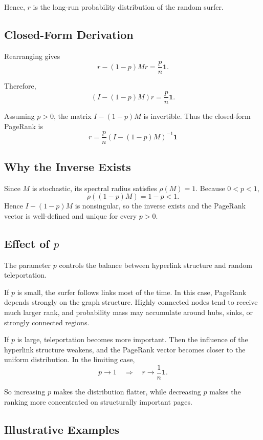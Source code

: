 \documentclass[12pt]{article}
\begin{document}
Hence, $r$ is the long-run probability distribution of the random surfer.

\subsection{Closed-Form Derivation}

Rearranging gives
\[
r - (1-p)Mr = \frac{p}{n}\mathbf{1}.
\]

Therefore,
\[
(I-(1-p)M)r = \frac{p}{n}\mathbf{1}.
\]

Assuming $p>0$, the matrix $I-(1-p)M$ is invertible. Thus the closed-form PageRank is
\[
\boxed{
r = \frac{p}{n}(I-(1-p)M)^{-1}\mathbf{1}
}
\]

\subsection{Why the Inverse Exists}

Since $M$ is stochastic, its spectral radius satisfies $\rho(M)=1$. Because $0<p<1$,
\[
\rho((1-p)M)=1-p<1.
\]
Hence $I-(1-p)M$ is nonsingular, so the inverse exists and the PageRank vector is well-defined and unique for every $p>0$.

\subsection{Effect of $p$}

The parameter $p$ controls the balance between hyperlink structure and random teleportation.

If $p$ is small, the surfer follows links most of the time. In this case, PageRank depends strongly on the graph structure. Highly connected nodes tend to receive much larger rank, and probability mass may accumulate around hubs, sinks, or strongly connected regions.

If $p$ is large, teleportation becomes more important. Then the influence of the hyperlink structure weakens, and the PageRank vector becomes closer to the uniform distribution. In the limiting case,
\[
p \to 1 \quad \Rightarrow \quad r \to \frac{1}{n}\mathbf{1}.
\]

So increasing $p$ makes the distribution flatter, while decreasing $p$ makes the ranking more concentrated on structurally important pages.

\subsection{Illustrative Examples}
\end{document}
